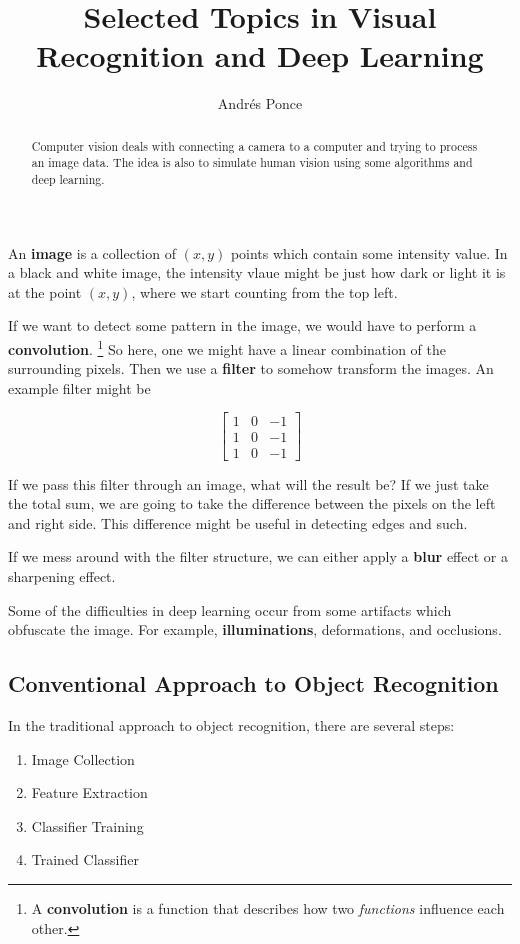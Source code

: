 \documentclass{tufte-handout}
\title{Selected Topics in Visual Recognition and Deep Learning}
\author{Andr\'es Ponce}
\begin{document}
\maketitle

\begin{abstract}
	Computer vision deals with connecting a camera to a computer and
	trying to process an image data. The idea is also to simulate 
	human vision using some algorithms and deep learning.
\end{abstract}

An \textbf{image} is a collection of $(x,y)$ points which contain some 
intensity value.
In a black and white image, the intensity vlaue might be just how dark or
light it is at the point $(x,y)$, where we start counting from the top left.

If we want to detect some pattern in the image, we would have to perform a 
\textbf{convolution}.
\footnote{A \textbf{convolution} is a function that describes how two 
\textit{functions} influence each other.} 
So here, one we might have a linear combination of the surrounding pixels.
Then we use a \textbf{filter} to somehow transform the images.
An example filter might be 

\begin{center}
	\[
	\begin{bmatrix}
		1 & 0 & -1\\
		1 & 0 & -1\\
		1 & 0 & -1
	\end{bmatrix}
	\]
\end{center}

If we pass this filter through an image, what will the result be? 
If we just take the total sum, we are going to take the difference between the 
pixels on the left and right side.
This difference might be useful in detecting edges and such.

If we mess around with the filter structure, we can either apply a \textbf{blur} 
effect or a sharpening effect.

Some of the difficulties in deep learning occur from some artifacts which 
obfuscate the image. 
For example, \textbf{illuminations}, deformations, and occlusions.

\subsection{Conventional Approach to Object Recognition}
In the traditional approach to object recognition, there are several steps:
\begin{enumerate}
	\item Image Collection
	\item Feature Extraction
	\item Classifier Training
	\item Trained Classifier
\end{enumerate}
\end{document}
